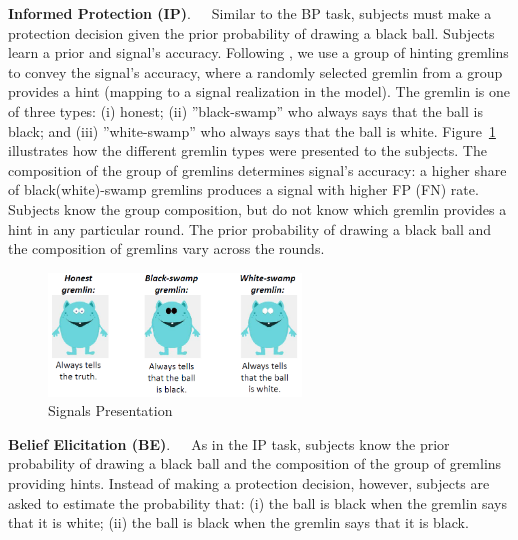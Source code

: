 \documentclass[12pt,a4paper]{article}
\begin{document}
\bigskip
\noindent\textbf{Informed Protection (IP)}.\ \ \ Similar to the BP task, subjects must make a protection decision given the prior probability of drawing a black ball. Subjects learn a prior and signal's accuracy. Following \citet{coutts_good_2019}, we use a group of hinting gremlins to convey the signal's accuracy, where a randomly selected gremlin from a group provides a hint (mapping to a signal realization in the model). The gremlin is one of three types: (i) honest; (ii) ''black-swamp'' who always says that the ball is black; and (iii) ''white-swamp'' who always says that the ball is white. Figure~\ref{fig:Gremlins} illustrates how the different gremlin types were presented to the subjects. The composition of the group of gremlins determines signal's accuracy: a higher share of black(white)-swamp gremlins produces a signal with higher FP (FN) rate. Subjects know the group composition, but do not know which gremlin provides a hint in any particular round. The prior probability of drawing a black ball and the composition of gremlins vary across the rounds.  

\begin{figure}[H]
\centering
\caption{Signals Presentation} \label{fig:Gremlins}
\includegraphics[width=0.6\textwidth]{Graphs/gremlins1.png}
\end{figure}


\bigskip
\noindent\textbf{Belief Elicitation (BE)}.\ \ \ 
As in the IP task, subjects know the prior probability of drawing a black ball and the composition of the group of gremlins providing hints. Instead of making a protection decision, however, subjects are asked to estimate the probability that: (i) the ball is black when the gremlin says that it is white; (ii) the ball is black when the gremlin says that it is black. 
\end{document}
